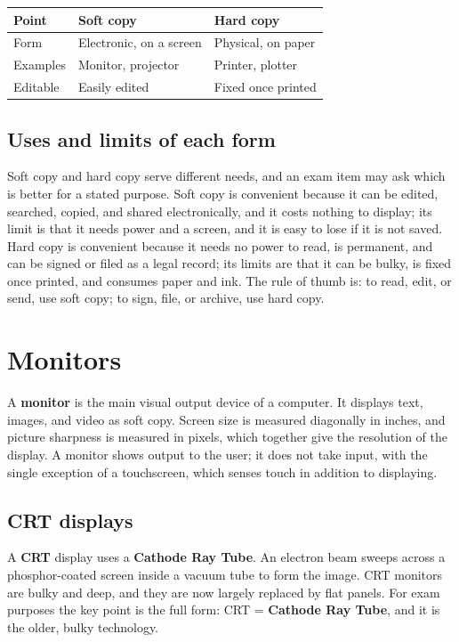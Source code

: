 \documentclass[11pt]{article}
\begin{document}
\begin{center}
\begin{tabular}{p{}p{}p{}}
\toprule
\textbf{Point} & \textbf{Soft copy} & \textbf{Hard copy} \\
\midrule
Form & Electronic, on a screen & Physical, on paper \\
Examples & Monitor, projector & Printer, plotter \\
Editable & Easily edited & Fixed once printed \\
\bottomrule
\end{tabular}
\end{center}

\subsection{Uses and limits of each form}
Soft copy and hard copy serve different needs, and an exam item may ask which
is better for a stated purpose. Soft copy is convenient because it can be
edited, searched, copied, and shared electronically, and it costs nothing to
display; its limit is that it needs power and a screen, and it is easy to lose
if it is not saved. Hard copy is convenient because it needs no power to read,
is permanent, and can be signed or filed as a legal record; its limits are
that it can be bulky, is fixed once printed, and consumes paper and ink. The
rule of thumb is: to read, edit, or send, use soft copy; to sign, file, or
archive, use hard copy.

\section{Monitors}
A \textbf{monitor} is the main visual output device of a computer. It displays
text, images, and video as soft copy. Screen size is measured diagonally in
inches, and picture sharpness is measured in pixels, which together give the
resolution of the display. A monitor shows output to the user; it does not
take input, with the single exception of a touchscreen, which senses touch in
addition to displaying.

\subsection{CRT displays}
A \textbf{CRT} display uses a \textbf{Cathode Ray Tube}. An electron beam
sweeps across a phosphor-coated screen inside a vacuum tube to form the image.
CRT monitors are bulky and deep, and they are now largely replaced by flat
panels. For exam purposes the key point is the full form: CRT = \textbf{Cathode
Ray Tube}, and it is the older, bulky technology.
\end{document}
